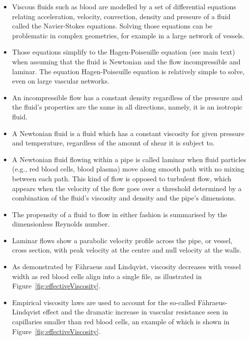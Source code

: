 \documentclass[12pt,a4paper]{journal}
\begin{document}
\begin{tcolorbox}[title=Additional information -- Fluid flow modelling]
  \begin{itemize}
  \item Viscous fluids such as blood are modelled by a set of differential equations relating acceleration, velocity, convection, density and pressure of a fluid called the Navier-Stokes equations.
    Solving those equations can be problematic in complex geometries, for example in a large network of vessels.
  \item Those equations simplify to the Hagen-Poiseuille equation (see main text) when assuming that the fluid is Newtonian and the flow incompressible and laminar.
    The equation Hagen-Poiseuille equation is relatively simple to solve, even on large vascular networks.
  \item An incompressible flow has a constant density regardless of the pressure and the fluid's properties are the same in all directions, namely, it is an isotropic fluid.
  \item A Newtonian fluid is a fluid which has a constant viscosity for given pressure and temperature, regardless of the amount of shear it is subject to.
  \item A Newtonian fluid flowing within a pipe is called laminar when fluid particles (e.g., red blood cells, blood plasma) move along smooth path with no mixing between each path.
    This kind of flow is opposed to turbulent flow, which appears when the velocity of the flow goes over a threshold determined by a combination of the fluid's viscosity and density and the pipe's dimensions.
  \item The propensity of a fluid to flow in either fashion is summarised by the dimensionless Reynolds number.
  \item Laminar flows show a parabolic velocity profile across the pipe, or vessel, cross section, with peak velocity at the centre and null velocity at the walls.
  \item As demonstrated by F\r ahraeus and Lindqvist, viscosity decreases with vessel width as red blood cells align into a single file, as illustrated in Figure~\ref{fig:effectiveViscosity}.~\cite{Faahraeus_1931}
  \item Empirical viscosity laws are used to account for the so-called F\r ahraeus-Lindqvist effect and the dramatic increase in vascular resistance seen in capillaries smaller than red blood cells, an example of which is shown in Figure~\ref{fig:effectiveViscosity}.~\cite{Haynes_1960,Pries_1990,Secomb_2013}
  \end{itemize}
\end{tcolorbox}
\end{document}
